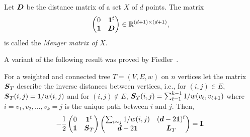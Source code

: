 Let $\vb*{D}$ be the distance matrix of a set $X$ of $d$ points. The matrix 
\begin{equation}
\label{eq:menger_matrix}
\begin{pmatrix}
0 & \vb{1}^t \\
\vb{1} & \vb*{D}
\end{pmatrix}\in\mathbb{R}^{(d+1)\times (d+1)},
\end{equation}
is called the \emph{Menger matrix of $X$}. 


A variant of the following result was proved by Fiedler~\cite{fiedler2011matrices}. 
\begin{lemma}
	\label{lem:block_matrix_tree}
 For a weighted and connected tree $T=(V,E,w)$ on $n$ vertices let the matrix $\vb*{S}_T$ describe the inverse distances  between vertices, i.e., for $(i,j)\in E$, $\vb*{S}_T(i,j) = 1/w(i,j)$ and for $(i,j)\notin E$, $\vb*{S}_T(i,j) = \sum_{\ell=1}^{k-1} 1/w(v_\ell,v_{\ell+1})$ where $i=v_1,v_2,\dots,v_k=j$ is the unique path between $i$ and $j$. Then,
 \begin{equation}
 \label{eq:block_ST}
-\frac{1}{2} \begin{pmatrix}
0 & \vb{1}^t \\
\vb{1} & \vb*{S}_T 
\end{pmatrix}
\begin{pmatrix}
\sum_{i\sim j}1/w(i,j)  & (\vb*{d}-2\vb{1})^t \\
\vb*{d}-2\vb{1} & \vb*{L}_T
\end{pmatrix} = \vb{I}.
 \end{equation}
\end{lemma}
